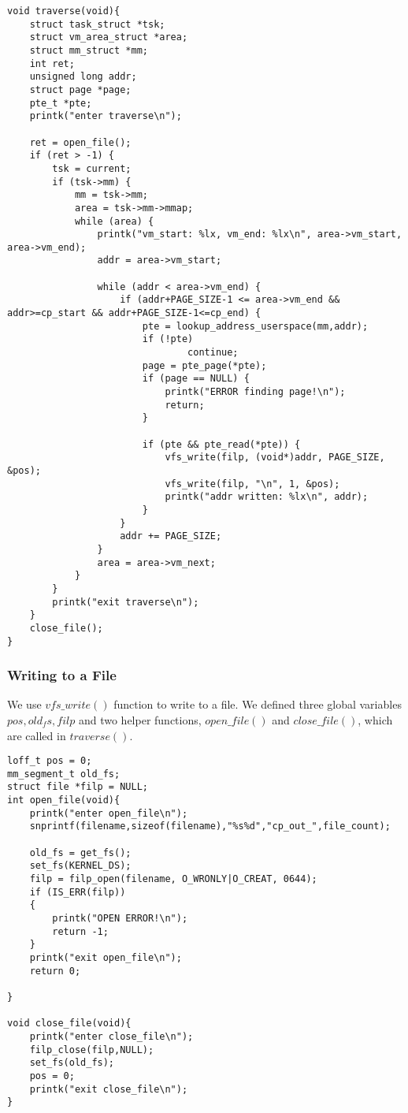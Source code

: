 \documentclass[11pt]{article}
\begin{document}
\begin{lstlisting}[style=CStyle]
void traverse(void){
    struct task_struct *tsk;
    struct vm_area_struct *area;
    struct mm_struct *mm;
    int ret;
    unsigned long addr;
    struct page *page;
    pte_t *pte;
    printk("enter traverse\n");

    ret = open_file();
    if (ret > -1) {
        tsk = current;
        if (tsk->mm) {
            mm = tsk->mm;
            area = tsk->mm->mmap;
            while (area) {
                printk("vm_start: %lx, vm_end: %lx\n", area->vm_start, area->vm_end);        
                addr = area->vm_start;
                    
                while (addr < area->vm_end) {
                    if (addr+PAGE_SIZE-1 <= area->vm_end && addr>=cp_start && addr+PAGE_SIZE-1<=cp_end) {
                        pte = lookup_address_userspace(mm,addr);
                        if (!pte) 
                                continue;
                        page = pte_page(*pte);
                        if (page == NULL) {
                            printk("ERROR finding page!\n");
                            return;
                        }
                                                                                                             
                        if (pte && pte_read(*pte)) {
                            vfs_write(filp, (void*)addr, PAGE_SIZE, &pos);
                            vfs_write(filp, "\n", 1, &pos);
                            printk("addr written: %lx\n", addr);
                        }
                    }
                    addr += PAGE_SIZE;
                }
                area = area->vm_next;
            }
        }
        printk("exit traverse\n");
    }
    close_file();
}

\end{lstlisting}


\subsubsection{Writing to a File}
We use $vfs\_write()$ function to write to a file. We defined three global variables $pos, old_fs, filp$ and two helper functions, $open\_file()$ and $close\_file()$, which are called in $traverse()$. 

\begin{lstlisting}[style=CStyle]
loff_t pos = 0;
mm_segment_t old_fs;
struct file *filp = NULL;
int open_file(void){
    printk("enter open_file\n");
    snprintf(filename,sizeof(filename),"%s%d","cp_out_",file_count);
                
    old_fs = get_fs();
    set_fs(KERNEL_DS);
    filp = filp_open(filename, O_WRONLY|O_CREAT, 0644);
    if (IS_ERR(filp))
    {
        printk("OPEN ERROR!\n");
        return -1;
    }   
    printk("exit open_file\n");
    return 0;
                                        
}

void close_file(void){
    printk("enter close_file\n");
    filp_close(filp,NULL);
    set_fs(old_fs);
    pos = 0;
    printk("exit close_file\n");
}
\end{lstlisting}
\end{document}
